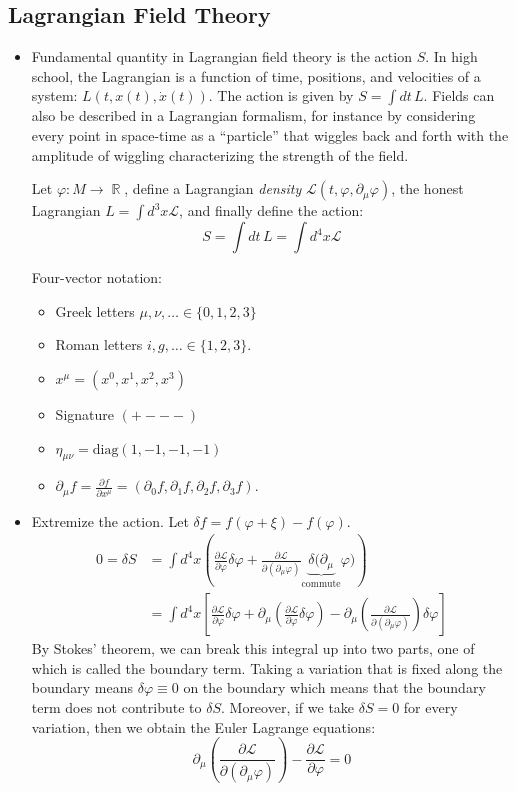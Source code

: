 \documentclass{report}
\theoremstyle{plain}
\theoremstyle{definition}
\theoremstyle{remark}
\newcommand{\FR}[2]{\frac{#1}{#2}}
\newcommand{\mc}{\mathcal}
\newcommand{\vphi}{\varphi}
\newcommand{\di}{\partial}
\newcommand{\ddi}[2]{\FR{\partial {#1}}{\partial {#2}}}
\DeclareMathOperator{\bR}{\mathbb{R}}
\begin{document}
\subsection{Lagrangian Field Theory}
    \begin{itemize}
        \item Fundamental quantity in Lagrangian field theory is the action $S$.
In high school, the Lagrangian is a function of time,
positions, and velocities of a system: $L(t,x(t),\dot x(t))$. The action
is given by $S = \int dt\, L$.
Fields can also be described in a Lagrangian formalism, for instance by
considering every point in space-time as a ``particle'' that wiggles back
and forth with the amplitude of wiggling characterizing the strength of the
field.

Let $\vphi : M \to \bR$, define a Lagrangian \emph{density} $\mc
L(t,\vphi,\di_\mu \vphi)$, the honest Lagrangian $L = \int d^3x \mc L$, and
finally define the action: \[ S = \int dt\, L = \int d^4x \mc L \]

\begin{mdframed}
    Four-vector notation:
    \begin{itemize}
        \item Greek letters $\mu,\nu,\ldots \in \{0,1,2,3\}$
        \item Roman letters $i,g,\ldots \in \{1,2,3\}$.
        \item $x^\mu = (x^0,x^1,x^2,x^3)$
        \item Signature $(+---)$
        \item $\eta_{\mu\nu} = \mathrm{diag}(1,-1,-1,-1)$
        \item $\di_\mu f = \FR{\di f}{\di x^\mu} = (\di_0 f,\di_1 f,\di_2
            f,\di_3 f)$.
    \end{itemize}
\end{mdframed}

\item Extremize the action. Let $\delta f = f(\vphi+\xi) - f(\vphi)$.
    \begin{align*}
        0 = \delta S &= \int d^4 x \left( \ddi{\mc L}{\vphi}\delta\vphi
        +\ddi{\mc L}{(\di_\mu \vphi)}
        \underbrace{\delta(\di_\mu}_{\text{commute}}\vphi)\right)\\
        &= \int d^4 x \left[ \ddi{\mc L}{\vphi}\delta\vphi
        + \di_\mu \left(  \ddi{\mc L}{\vphi}\delta\vphi \right)
    - \di_\mu \left(\ddi{\mc L}{(\di_\mu\vphi)}\right)\delta\vphi \right]
    \end{align*}
    By Stokes' theorem, we can break this integral up into two parts, one
    of which is called the boundary term. Taking a variation that is fixed
    along the boundary means $\delta\vphi \equiv 0$ on the boundary which
    means that the boundary term does not contribute to $\delta S$.
    Moreover, if we take $\delta S = 0$ for every variation, then we obtain
    the Euler Lagrange equations:
    \[ \di_\mu \left( \ddi{\mc L}{(\di_\mu \vphi)} \right) - \ddi{\mc
    L}{\vphi} = 0 \]


\end{itemize}
\end{document}
